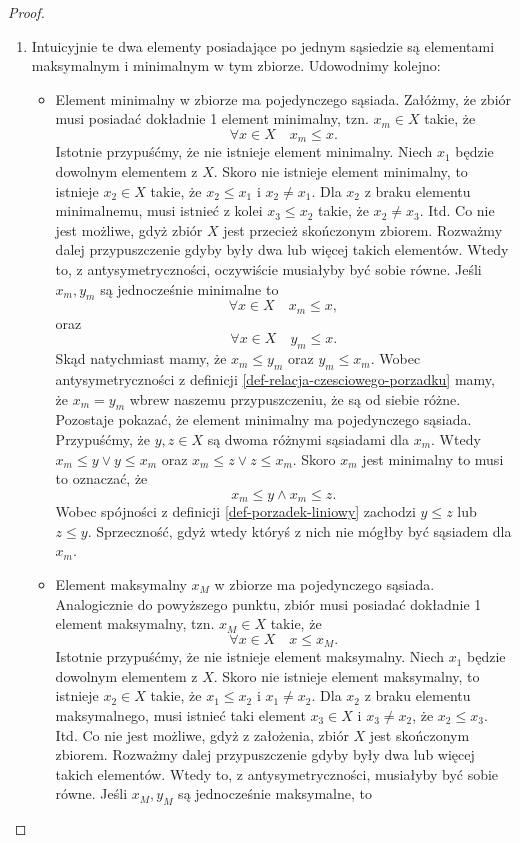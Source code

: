 \documentclass[12pt,a4paper]{report}
\begin{document}
\begin{proof}
\begin{enumerate}
\item Intuicyjnie te dwa elementy posiadające po jednym sąsiedzie są elementami maksymalnym i minimalnym w tym zbiorze. Udowodnimy kolejno:
\begin{itemize}
\item Element minimalny w zbiorze ma pojedynczego sąsiada. Załóżmy, że zbiór musi posiadać dokładnie 1 element minimalny, tzn. $x_m \in X$ takie, że 
$$
\forall x \in X \quad x_m \leq x.
$$
Istotnie przypuśćmy, że nie istnieje element minimalny. Niech $x_1$ będzie dowolnym elementem z $X$. Skoro nie istnieje element minimalny, to istnieje $x_2 \in X$ takie, że $x_2 \leq x_1$ i $x_2 \neq x_1$. Dla $x_2$ z braku elementu minimalnemu, musi istnieć z kolei $x_3 \leq x_2$ takie, że $x_2 \neq x_3$. Itd. Co nie jest możliwe, gdyż zbiór $X$ jest przecież skończonym zbiorem.
Rozważmy dalej przypuszczenie gdyby były dwa lub więcej takich elementów. Wtedy to, z antysymetryczności, oczywiście musiałyby być sobie równe. Jeśli $x_m, y_m$ są jednocześnie minimalne to
$$
\forall x \in X \quad x_m \leq x,
$$
oraz 
$$
\forall x \in X \quad y_m \leq x.
$$
Skąd natychmiast mamy, że $ x_m \leq y_m$ oraz $y_m \leq x_m$. Wobec antysymetryczności z definicji \ref{def-relacja-czesciowego-porzadku} mamy, że $x_m = y_m$ wbrew naszemu przypuszczeniu, że są od siebie różne.
Pozostaje pokazać, że element minimalny ma pojedynczego sąsiada. Przypuśćmy, że $y,z \in X$ są dwoma różnymi sąsiadami dla $x_m$. Wtedy $ x_m \leq y \lor y \leq x_m$ oraz $ x_m \leq z \lor z \leq x_m$. Skoro $x_m$ jest minimalny to musi to oznaczać, że
$$
x_m \leq y \land x_m \leq z.
$$ 
Wobec spójności z definicji \ref{def-porzadek-liniowy} zachodzi $y \leq z$ lub $z \leq y$. Sprzeczność, gdyż wtedy któryś z nich nie mógłby być sąsiadem dla $x_m$.
\item Element maksymalny $x_M$ w zbiorze ma pojedynczego sąsiada. Analogicznie do powyższego punktu, zbiór musi posiadać dokładnie 1 element maksymalny, tzn. $x_M \in X$ takie, że
$$\forall x \in X \quad x \leq x_M.$$
Istotnie przypuśćmy, że nie istnieje element maksymalny. Niech $x_1$ będzie dowolnym elementem z $X$. Skoro nie istnieje element maksymalny, to istnieje $x_2 \in X$ takie, że $x_1 \leq x_2$ i $x_1 \neq x_2$. Dla $x_2$ z braku elementu maksymalnego, musi istnieć taki element $x_3 \in X$ i $x_3 \neq x_2$, że $x_2 \leq x_3$. Itd. Co nie jest możliwe, gdyż z założenia, zbiór $X$ jest skończonym zbiorem.
Rozważmy dalej przypuszczenie gdyby były dwa lub więcej takich elementów. Wtedy to, z antysymetryczności, musiałyby być sobie równe. Jeśli $x_M, y_M$ są jednocześnie maksymalne, to 

\end{itemize}
\end{enumerate}
\end{proof}
\end{document}

